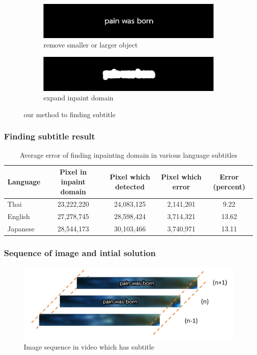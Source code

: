 \documentclass[xcolor=dvipsnames, xetex,serif]{beamer}
\begin{document}
\begin{frame}
\begin{figure}[H]
\begin{subfigure}{0.4\linewidth}
                \centering
                \includegraphics[width=0.8\linewidth]{images/subtitle_detection/detection-erode-opening.png}
                \caption{remove smaller or larger object}
            \end{subfigure}
            \begin{subfigure}{0.4\linewidth}
                \centering
                \includegraphics[width=0.8\linewidth]{images/subtitle_detection/detection-stoke.png}
                \caption{expand inpaint domain}
            \end{subfigure}
            \caption{our method to finding subtitle}
        \end{figure}
    \end{frame}
    \begin{frame}
        \frametitle{Finding subtitle result}
        \begin{table}[H]
            \centering
            \footnotesize
            \begin{tabular}[ht]{|l|c|c|c|c|}
                \hline
                Language  & Pixel in inpaint domain & Pixel which detected & Pixel which error & Error (percent) \\
                \hline
                Thai & 23,222,220 & 24,083,125 & 2,141,201 & 9.22 \\
                English & 27,278,745 & 28,598,424 & 3,714,321 & 13.62 \\
                Japanese & 28,544,173 & 30,103,466 & 3,740,971 & 13.11 \\
                \hline
            \end{tabular}
            \caption{Average error of finding inpainting domain in various language subtitles}
        \end{table}	
    \end{frame}
    \begin{frame}
        \frametitle{Sequence of image and intial solution}
        \begin{figure}[H]
            \centering
            \includegraphics[width=0.8\linewidth]{images/skipborrow/frame_sequence.png}
            \caption{Image sequence in video which has subtitle}
        \end{figure}
    \end{frame}
\end{document}
